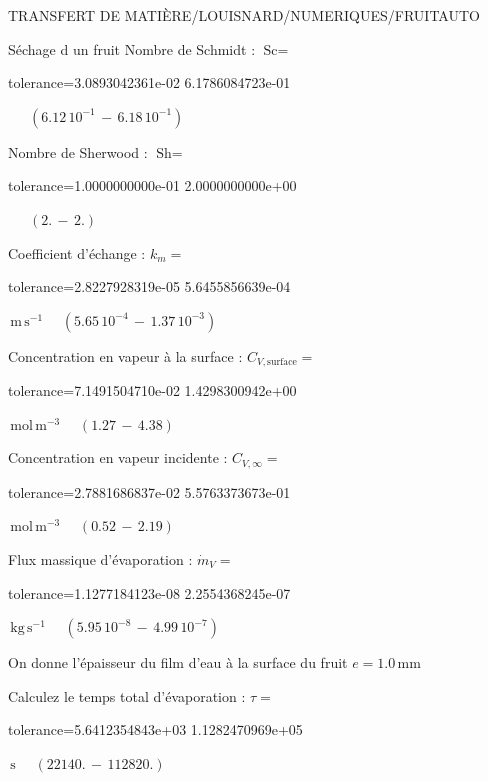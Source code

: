 \documentclass[12pt]{article}
\begin{document}
\begin{quiz}{TRANSFERT DE MATIÈRE/LOUISNARD/NUMERIQUES/FRUITAUTO}
\begin{cloze}{Séchage d un fruit}
Nombre de Schmidt : $\text{Sc} =  $
\begin{numerical}[points=1] 
\item[tolerance={3.0893042361e-02}] 6.1786084723e-01 
\end{numerical} 
 $\,$ 
 $ \quad ( 6.12 \, 10^{-1}  \, - \,  6.18 \, 10^{-1} ) $ 

Nombre de Sherwood : $\text{Sh} =  $
\begin{numerical}[points=2] 
\item[tolerance={1.0000000000e-01}] 2.0000000000e+00 
\end{numerical} 
 $\,$ 
 $ \quad (2. \, - \, 2.) $ 

Coefficient d'échange : $k_m =  $
\begin{numerical}[points=1] 
\item[tolerance={2.8227928319e-05}] 5.6455856639e-04 
\end{numerical} 
 $\,  \mathrm{m}\,  \mathrm{s}^{-1}$ 
 $ \quad ( 5.65 \, 10^{-4}  \, - \,  1.37 \, 10^{-3} ) $ 

Concentration en vapeur à la surface : $C_{V, \text{surface}} =  $
\begin{numerical}[points=2] 
\item[tolerance={7.1491504710e-02}] 1.4298300942e+00 
\end{numerical} 
 $\,  \mathrm{mol}\,  \mathrm{m}^{-3}$ 
 $ \quad (1.27 \, - \, 4.38) $ 

Concentration en vapeur incidente : $C_{V, \infty} =  $
\begin{numerical}[points=2] 
\item[tolerance={2.7881686837e-02}] 5.5763373673e-01 
\end{numerical} 
 $\,  \mathrm{mol}\,  \mathrm{m}^{-3}$ 
 $ \quad (0.52 \, - \, 2.19) $ 

Flux massique d'évaporation : $\dot{m}_V =  $
\begin{numerical}[points=1] 
\item[tolerance={1.1277184123e-08}] 2.2554368245e-07 
\end{numerical} 
 $\,  \mathrm{kg}\,  \mathrm{s}^{-1}$ 
 $ \quad ( 5.95 \, 10^{-8}  \, - \,  4.99 \, 10^{-7} ) $ 

 

On donne l'épaisseur du film d'eau à la surface du fruit $e = 1.0\,  \mathrm{mm} $

Calculez le temps total d'évaporation : $\tau =  $
\begin{numerical}[points=2] 
\item[tolerance={5.6412354843e+03}] 1.1282470969e+05 
\end{numerical} 
 $\,  \mathrm{s}$ 
 $ \quad (22140. \, - \, 112820.) $ 


\end{cloze}
\end{quiz}
\end{document}
